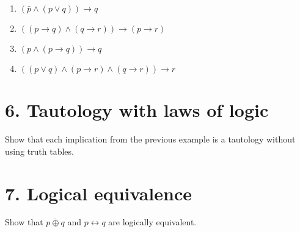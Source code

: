 \documentclass[a4paper,10pt]{article}
\begin{document}
\begin{enumerate}
  \item $(\bar{p} \land (p \lor q)) \to q$
  \item $((p \to q) \land (q \to r)) \to (p \to r)$
  \item $(p \land (p \to q)) \to q$
  \item $((p \lor q) \land (p \to r) \land (q \to r)) \to r$
\end{enumerate}

\newpage
\mbox{} 

\newpage
\mbox{}

\section*{6. Tautology with laws of logic}
Show that each implication from the previous example is a tautology without using truth tables.

\newpage
\mbox{} 

\newpage
\mbox{}

\section*{7. Logical equivalence}
Show that $\overline{p \oplus q}$ and $p \leftrightarrow q$ are logically equivalent.



\newpage
\mbox{} 

\newpage
\mbox{} 
\end{document}

